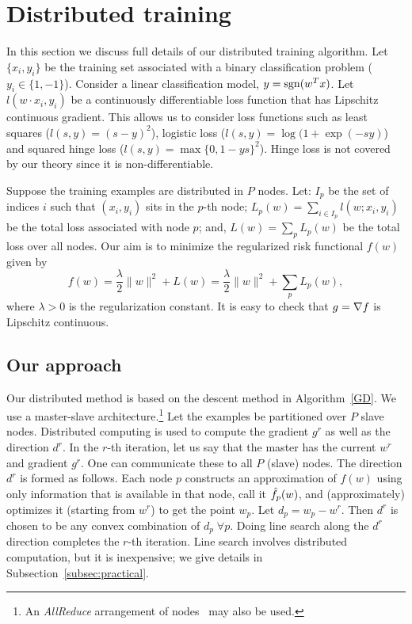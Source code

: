 \documentclass[twoside, 11pt]{article}
\begin{document}
%

\section{Distributed training}
\label{distr}


In this section we discuss full details of our distributed training algorithm.
Let $\{x_i,y_i\}$ be the training set associated with a binary classification problem ($y_i\in\{1,-1\}$). Consider a linear classification model, $y=\operatorname{sgn}(w^Tx)$. Let $l(w\cdot x_i,y_i)$ be a continuously differentiable loss function that has Lipschitz continuous gradient. This allows us to consider loss functions such as least squares ($l(s,y)=(s-y)^2$), logistic loss ($l(s,y)=\log(1+\exp(-sy)$) and squared hinge loss ($l(s,y)=\max\{0, 1-ys\}^2$). Hinge loss is not covered by our theory since it is non-differentiable.

Suppose the training examples are distributed in $P$ nodes. Let: $I_p$ be the set of indices $i$ such that $(x_i,y_i)$ sits in the $p$-th node; $L_p(w) = \sum_{i\in I_p} l(w;x_i,y_i)$ be the total loss associated with node $p$; and, $L(w)=\sum_p L_p(w)$ be the total loss over all nodes. Our aim is to minimize the regularized risk functional $f(w)$ given by
\begin{equation}
f(w) = \frac{\lambda}{2} \|w\|^2 + L(w) = \frac{\lambda}{2} \|w\|^2 + \sum_p L_p(w),
\label{risk}
\end{equation}
where $\lambda>0$ is the regularization constant. It is easy to check that $g=\nabla f$ is Lipschitz continuous.

\subsection{Our approach}
\label{subsec:approach}

Our distributed method is based on the descent method in Algorithm~\ref{GD}. We use a master-slave architecture.\footnote{An {\it AllReduce} arrangement of nodes~\citep{agarwal2011} may also be used.} Let the examples be partitioned over $P$ slave nodes. Distributed computing is used to compute the gradient $g^r$ as well as the direction $d^r$.  In the $r$-th iteration, let us say that the master has the current $w^r$ and gradient $g^r$. One can communicate these to all $P$ (slave) nodes. The direction $d^r$ is formed as follows. Each node $p$ constructs an approximation of $f(w)$ using only information that is available in that node, call it $\hat{f}_p(w)$, and (approximately) optimizes it (starting from $w^r$) to get the point $w_p$. Let $d_p=w_p-w^r$. Then $d^r$ is chosen to be any convex combination of $d_p\;\forall p$. Doing line search along the $d^r$ direction completes the $r$-th iteration. Line search involves distributed computation, but it is inexpensive; we give details in Subsection~\ref{subsec:practical}.
\end{document}
